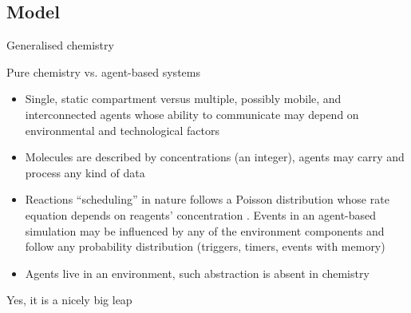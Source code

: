 \documentclass[presentation]{beamer} %
\begin{document}
\subsection{Model}
\begin{frame}{Generalised chemistry}
\begin{block}{Pure chemistry vs. agent-based systems}
\begin{itemize}
 \item Single, static compartment versus multiple, possibly mobile, and interconnected agents whose ability to communicate may depend on environmental and technological factors
 \item Molecules are described by concentrations (an integer), agents may carry and process any kind of data
 \item Reactions ``scheduling'' in nature follows a Poisson distribution whose rate equation depends on reagents' concentration \cite{gillespie1977}. Events in an agent-based simulation may be influenced by any of the environment components and follow any probability distribution (triggers, timers, events with memory)
 \item Agents live in an environment, such abstraction is absent in chemistry
\end{itemize}
\end{block}
Yes, it is a nicely big leap
\end{frame}

\end{document}
